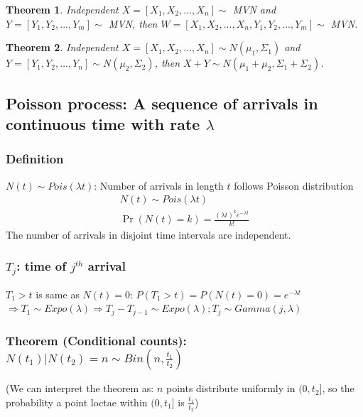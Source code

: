 \documentclass[11pt,a4paper]{article}
\newtheorem{theorem}{Theorem}
\begin{document}
\begin{theorem}
    Independent $X=[X_1,X_2,...,X_n]\sim$ MVN and $Y=[Y_1,Y_2,...,Y_m]\sim$ MVN, then $W=[X_1,X_2,...,X_n,Y_1,Y_2,...,Y_m]\sim$ MVN.
\end{theorem}

\begin{theorem}
    Independent $X=[X_1,X_2,...,X_n]\sim N(\mu_1,\Sigma_1)$ and $Y=[Y_1,Y_2,...,Y_n]\sim N(\mu_2,\Sigma_2)$, then $X+Y\sim N(\mu_1+\mu_2,\Sigma_1+\Sigma_2)$.
\end{theorem}














\subsection{Poisson process: A sequence of arrivals in continuous time with rate $\lambda$}
\subsubsection{Definition}
$N(t)\sim Pois(\lambda t)$: Number of arrivals in length $t$ follows Poisson distribution
\begin{equation}
    \begin{aligned}
        N(t)\sim Pois(\lambda t)\\
        \Pr(N(t)=k)=\frac{(\lambda t)^k e^{-\lambda t}}{k!}
    \end{aligned}
    \nonumber
\end{equation}
The number of arrivals in disjoint time intervals are independent.
\subsubsection{$T_j$: time of $j^{th}$ arrival}
$T_1>t$ is same as $N(t)=0$: $P(T_1>t)=P(N(t)=0)=e^{-\lambda t}$\\
$\Rightarrow T_1\sim Expo(\lambda) \Rightarrow T_j-T_{j-1}\sim Expo(\lambda); T_j\sim Gamma(j,\lambda)$

\subsubsection{Theorem (Conditional counts): $N(t_1)|N(t_2)=n\sim Bin(n,\frac{t_1}{t_2})$}
(We can interpret the theorem as: $n$ points distribute uniformly in $(0,t_2]$, so the probability a point loctae within $(0,t_1]$ is $\frac{t_1}{t_2}$)
\end{document}
